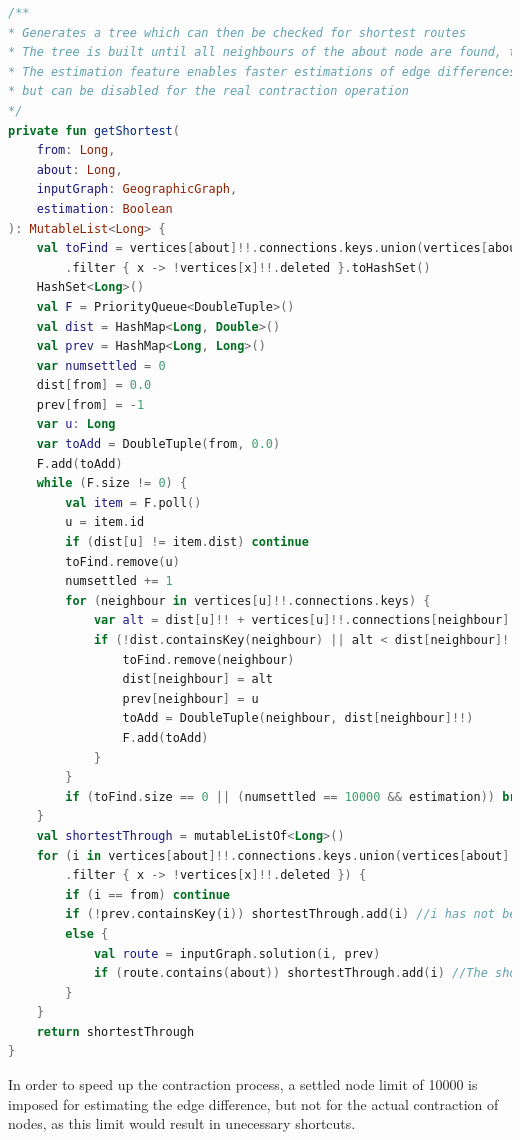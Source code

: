 \documentclass[11pt,twoside,a4paper]{article}
\begin{document}
\begin{lstlisting}[language=kotlin]
/**
* Generates a tree which can then be checked for shortest routes
* The tree is built until all neighbours of the about node are found, then queried to find if the shortest route goes through the about node
* The estimation feature enables faster estimations of edge differences by terminating the search after a given number of nodes,
* but can be disabled for the real contraction operation
*/
private fun getShortest(
    from: Long,
    about: Long,
    inputGraph: GeographicGraph,
    estimation: Boolean
): MutableList<Long> {
    val toFind = vertices[about]!!.connections.keys.union(vertices[about]!!.shortcutConnections.keys)
        .filter { x -> !vertices[x]!!.deleted }.toHashSet()
    HashSet<Long>()
    val F = PriorityQueue<DoubleTuple>()
    val dist = HashMap<Long, Double>()
    val prev = HashMap<Long, Long>()
    var numsettled = 0
    dist[from] = 0.0
    prev[from] = -1
    var u: Long
    var toAdd = DoubleTuple(from, 0.0)
    F.add(toAdd)
    while (F.size != 0) {
        val item = F.poll()
        u = item.id
        if (dist[u] != item.dist) continue
        toFind.remove(u)
        numsettled += 1
        for (neighbour in vertices[u]!!.connections.keys) {
            var alt = dist[u]!! + vertices[u]!!.connections[neighbour]!!
            if (!dist.containsKey(neighbour) || alt < dist[neighbour]!!) {
                toFind.remove(neighbour)
                dist[neighbour] = alt
                prev[neighbour] = u
                toAdd = DoubleTuple(neighbour, dist[neighbour]!!)
                F.add(toAdd)
            }
        }
        if (toFind.size == 0 || (numsettled == 10000 && estimation)) break
    }
    val shortestThrough = mutableListOf<Long>()
    for (i in vertices[about]!!.connections.keys.union(vertices[about]!!.shortcutConnections.keys)
        .filter { x -> !vertices[x]!!.deleted }) {
        if (i == from) continue
        if (!prev.containsKey(i)) shortestThrough.add(i) //i has not been reached because contraction has been terminated early, therefore a shortcut is necessary
        else {
            val route = inputGraph.solution(i, prev)
            if (route.contains(about)) shortestThrough.add(i) //The shortest route goes through the node therefore a shortcut is necessary
        }
    }
    return shortestThrough
}
\end{lstlisting}
In order to speed up the contraction process, a settled node limit of 10000 is imposed for estimating the edge difference, but not for the actual contraction of nodes, as this limit would result in unecessary shortcuts.
\newpage
\end{document}
